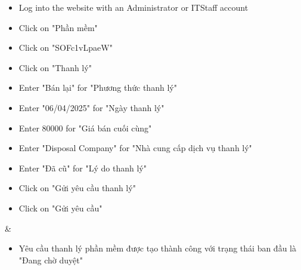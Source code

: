 \begin{longtable}
    \begin{itemize}[leftmargin=*,topsep=0pt,itemsep=0pt,label=--]
        \item Log into the website with an Administrator or ITStaff account
        \item Click on "Phần mềm"
        \item Click on "SOFc1vLpaeW"
        \item Click on "Thanh lý"
        \item Enter "Bán lại" for "Phương thức thanh lý"
        \item Enter "06/04/2025" for "Ngày thanh lý"
        \item Enter 80000 for "Giá bán cuối cùng"
        \item Enter "Disposal Company" for "Nhà cung cấp dịch vụ thanh lý"
        \item Enter "Đã cũ" for "Lý do thanh lý"
        \item Click on "Gửi yêu cầu thanh lý"
        \item Click on "Gửi yêu cầu"
    \end{itemize} &
    \begin{itemize}[leftmargin=*,topsep=0pt,itemsep=0pt,label=--]
        \item Yêu cầu thanh lý phần mềm được tạo thành công với trạng thái ban đầu là "Đang chờ duyệt"
    \end{itemize} \\
    \hline
\end{longtable}